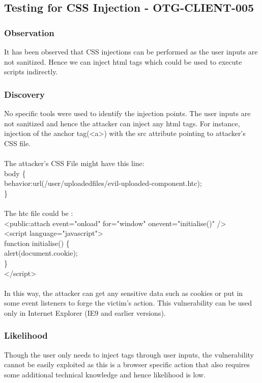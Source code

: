 \subsection{Testing for CSS Injection - OTG-CLIENT-005}

\subsubsection{Observation}
It has been observed that CSS injections can be performed as the user inputs are not sanitized. Hence we can inject html tags which could be used to execute scripts indirectly.

\subsubsection{Discovery}
No specific tools were used to identify the injection points. The user inputs are not sanitized and hence the attacker can inject any html tags. For instance, injection of the anchor tag(<a>) with the src attribute pointing to attacker's CSS file.\\
\\The attacker's CSS File might have this line: \\
body \{\\
  behavior:url(/user/uploadedfiles/evil-uploaded-component.htc); \\
\}
\\\\The htc file could be :\\
<public:attach event="onload" for="window" onevent="initialise()" />\\
<script language="javascript">\\
    function initialise() \{ \\
        alert(document.cookie);\\
    \} \\
</script>\\
\\In this way, the attacker can get any  sensitive data such as cookies or put in some event listeners to forge the victim’s action. This vulnerability can be used only in Internet Explorer (IE9 and earlier versions).

\subsubsection{Likelihood}
Though the user only needs to inject tags through user inputs, the vulnerability cannot be easily exploited as this is a browser specific action that also requires some additional technical knowledge and hence likelihood is low.

